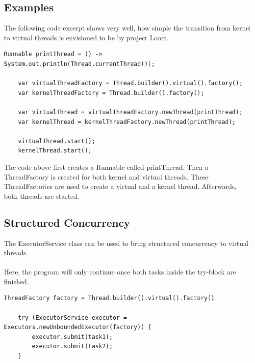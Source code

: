 \subsection{Examples}

The following code excerpt shows very well, how simple the transition from kernel to virtual threads is envisioned to be by project Loom.

\begin{lstlisting}[language=custom-java]
    Runnable printThread = () -> System.out.println(Thread.currentThread());

    var virtualThreadFactory = Thread.builder().virtual().factory();
    var kernelThreadFactory = Thread.builder().factory();

    var virtualThread = virtualThreadFactory.newThread(printThread);
    var kernelThread = kernelThreadFactory.newThread(printThread);

    virtualThread.start();
    kernelThread.start();
\end{lstlisting}
The code above first creates a Runnable called printThread.
Then a ThreadFactory is created for both kernel and virtual threads.
These ThreadFactories are used to create a virtual and a kernel thread.
Afterwards, both threads are started. \cite{Baeldung:Threads}

\subsection{Structured Concurrency}
The ExecutorService class can be used to bring structured concurrency to virtual threads.
\\
\\
Here, the program will only continue once both tasks inside the try-block are finished.

\begin{lstlisting}[language=custom-java,caption={Structured Concurrency - Simple \cite{loom:structured-concurrency}},captionpos=b]
    ThreadFactory factory = Thread.builder().virtual().factory()

    try (ExecutorService executor = Executors.newUnboundedExecutor(factory)) {
        executor.submit(task1);
        executor.submit(task2);
    }
\end{lstlisting}

